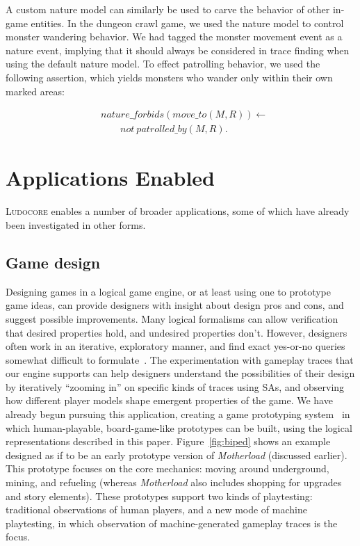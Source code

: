 \documentclass[conference]{IEEEtran}
\newcommand{\Ludocore}{\textsc{Ludocore}}
\newcommand{\snippet}[1]{{\vspace{-0.4cm}\begin{align*}#1\end{align*}\vspace{-0.4cm}}}
\begin{document}
A custom nature model can similarly be used to carve the behavior of other in-game
entities. In the dungeon crawl game, we used the nature model to control
monster wandering behavior. We had tagged the monster movement event as a
nature event, implying that it should always be considered in trace finding
when using the default nature model. To effect patrolling behavior, we used the
following assertion, which yields monsters who wander only within their own
marked areas:

\snippet{&nature\_forbids(move\_to(M,R)) \leftarrow\\&\qquad not\ patrolled\_by(M,R).}

\section{Applications Enabled}

\Ludocore{} enables a number of broader applications, some of which have
already been investigated in other forms.

\subsection{Game design}

Designing games in a logical game engine, or at least using one to prototype
game ideas, can provide designers with insight about design pros and cons, and
suggest possible improvements. Many logical formalisms can allow verification
that desired properties hold, and undesired properties don't. However,
designers often work in an iterative, exploratory manner, and find exact
yes-or-no queries somewhat difficult to formulate~\citep{FDG09}.
The experimentation with gameplay traces that our engine supports can help
designers understand the possibilities of their design by iteratively ``zooming
in'' on specific kinds of traces using SAs, and observing how different player
models shape emergent properties of the game. We have already begun pursuing
this application, creating a game prototyping system~\citep{AIIDE09} in which
human-playable, board-game-like prototypes can be built, using the logical
representations described in this paper.
Figure~\ref{fig:biped} shows an example designed as if to be an early
prototype version of \emph{Motherload} (discussed earlier).  This prototype
focuses on the core mechanics: moving around underground, mining, and refueling
(whereas \emph{Motherload} also includes shopping for upgrades and story
elements).  These prototypes support two kinds of playtesting: traditional
observations of human players, and a new mode of machine playtesting, in which
observation of machine-generated gameplay traces is the focus.
\end{document}
